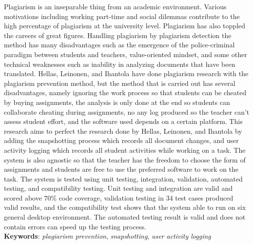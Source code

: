 \documentclass{skripsi}
\begin{document}
{\abstracteng

  \noindent
  Plagiarism is an inseparable thing from an academic environment. Various
  motivations including working part-time and social dilemmas contribute to the
  high percentage of plagiarism at the university level. Plagiarism has also
  toppled the careers of great figures. Handling plagiarism by plagiarism
  detection the method has many disadvantages such as the emergence of the
  police-criminal paradigm between students and teachers, value-oriented
  mindset, and some other technical weaknesses such as inability in analyzing
  documents that have been translated. Hellas, Leinonen, and Ihantola have done
  plagiarism research with the plagiarism prevention method, but the method that
  is carried out has several disadvantages, namely ignoring the work process so
  that students can be cheated by buying assignments, the analysis is only done
  at the end so students can collaborate cheating during assignments, no any log
  produced so the teacher can't assess student effort, and the software used
  depends on a certain platform. This research aims to perfect the research done
  by Hellas, Leinonen, and Ihantola by adding the snapshotting process which
  records all document changes, and user activity logging which records all
  student activities while working on a task. The system is also agnostic so
  that the teacher has the freedom to choose the form of assignments and
  students are free to use the preferred software to work on the task. The
  system is tested using unit testing, integration, validation, automated
  testing, and compatibility testing. Unit testing and integration are valid and
  scored above 70\% code coverage, validation testing in 34 test cases produced
  valid results, and the compatibility test shows that the system able to run on
  six general desktop environment. The automated testing result is valid and
  does not contain errors can speed up the testing process.\\

  \noindent
  \textbf{Keywords}: \emph{plagiarism prevention},
  \emph{snapshotting}, \emph{user activity logging}

}

\tableofcontents
{}
\listoftables
{}
\listoffigures
{}
{}
\end{document}
